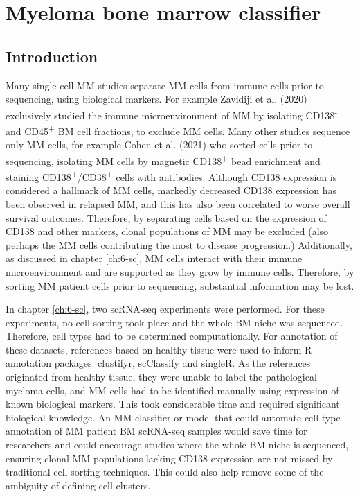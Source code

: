 \section{Myeloma bone marrow classifier}\label{sec:MM_classifier}
\subsection{Introduction}

Many single-cell MM studies separate MM cells from immune cells prior to sequencing, using biological markers.
For example Zavidiji et al. (2020) exclusively studied the immune microenvironment of MM by isolating CD138\textsuperscript{-} and CD45\textsuperscript{+} BM cell fractions, to exclude MM cells\cite{zavidij2020single}.
Many other studies sequence only MM cells, for example Cohen et al. (2021) who sorted cells prior to sequencing, isolating MM cells by magnetic CD138\textsuperscript{+} bead enrichment and staining CD138\textsuperscript{+}/CD38\textsuperscript{+} cells with antibodies\cite{cohen2021identification}.
Although CD138 expression is considered a hallmark of MM cells, markedly decreased CD138 expression has been observed in relapsed MM, and this has also been correlated to worse overall survival outcomes\cite{kawano2012multiple}.
Therefore, by separating cells based on the expression of CD138 and other markers, clonal populations of MM may be excluded (also perhaps the MM cells contributing the most to disease progression.)
Additionally, as discussed in chapter \ref{ch:6-sc}, MM cells interact with their immune microenvironment and are supported as they grow by immune cells.
Therefore, by sorting MM patient cells prior to sequencing, substantial information may be lost.

In chapter \ref{ch:6-sc}, two scRNA-seq experiments were performed.
For these experiments, no cell sorting took place and the whole BM niche was sequenced.
Therefore, cell types had to be determined computationally.
For annotation of these datasets, references based on healthy tissue were used to inform R annotation packages: clustifyr, scClassify and singleR.
As the references originated from healthy tissue, they were unable to label the pathological myeloma cells, and MM cells had to be identified manually using expression of known biological markers.
This took considerable time and required significant biological knowledge.
An MM classifier or model that could automate cell-type annotation of MM patient BM scRNA-seq samples would save time for researchers and could encourage studies where the whole BM niche is sequenced, ensuring clonal MM populations lacking CD138 expression are not missed by traditional cell sorting techniques.
This could also help remove some of the ambiguity of defining cell clusters.

